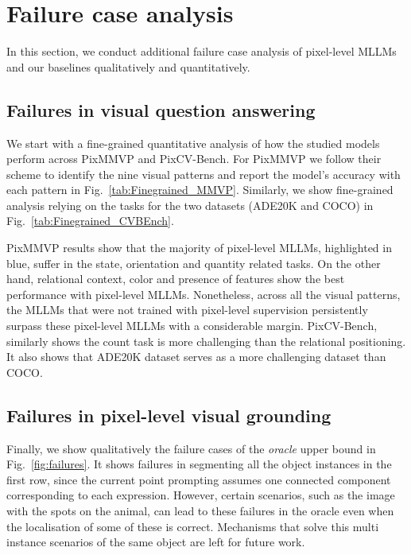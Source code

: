 \section{Failure case analysis}
\label{app:failure}
In this section, we conduct additional failure case analysis of pixel-level MLLMs and our baselines qualitatively and quantitatively. 
\subsection{Failures in visual question answering}
We start with a fine-grained quantitative analysis of how the studied models perform across PixMMVP and PixCV-Bench. For PixMMVP we follow their scheme to identify the nine visual patterns and report the model's accuracy with each pattern in Fig.~\ref{tab:Finegrained_MMVP}. Similarly, we show fine-grained analysis relying on the tasks for the two datasets (ADE20K and COCO) in Fig.~\ref{tab:Finegrained_CVBEnch}. 

PixMMVP results show that the majority of pixel-level MLLMs, highlighted in blue, suffer in the state, orientation and quantity related tasks. On the other hand, relational context, color and presence of features show the best performance with pixel-level MLLMs. Nonetheless, across all the visual patterns, the MLLMs that were not trained with pixel-level supervision persistently surpass these pixel-level MLLMs with a considerable margin. PixCV-Bench, similarly shows the count task is more challenging than the relational positioning. It also shows that ADE20K dataset serves as a more challenging dataset than COCO.

\begin{figure*}[t]
\centering

\caption{Fine-grained analysis of the studied models performance across the different visual pattern in PixMMVP showing the model's accuracy with each pattern.}
\label{tab:Finegrained_MMVP}
\end{figure*}

\begin{figure*}[t]
\centering

\caption{Fine-grained analysis of the studied models performance across the different visual patterns in PixCV-Bench (ADE20K and COCO), showing the model's accuracy with each pattern.}
\label{tab:Finegrained_CVBEnch}
\end{figure*}

\subsection{Failures in pixel-level visual grounding}
Finally, we show qualitatively the failure cases of the \textit{oracle} upper bound in Fig.~\ref{fig:failures}. It shows failures in segmenting all the object instances in the first row, since the current point prompting assumes one connected component corresponding to each expression. However, certain scenarios, such as the image with the spots on the animal, can lead to these failures in the oracle even when the localisation of some of these is correct. Mechanisms that solve this multi instance scenarios of the same object are left for future work. 

